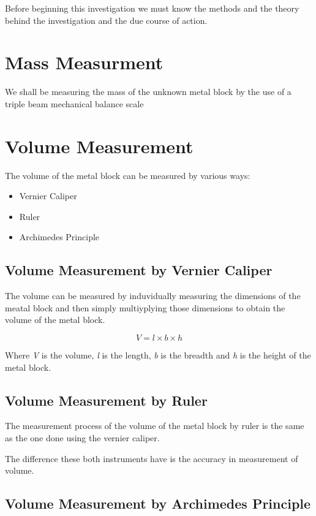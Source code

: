 {Before beginning this investigation we must know the methods and the theory behind the investigation and the due course of action.}

\section{Mass Measurment}

	{We shall be measuring the mass of the unknown metal block by the use of a triple beam mechanical balance scale}

\section{Volume Measurement}

	{The volume of the metal block can be measured by various ways:}
	
	\begin{itemize}
    		\item {Vernier Caliper}
    		\item {Ruler}
    		\item {Archimedes Principle}
    		\label{vol}
	\end{itemize}	
	
	\subsection{Volume Measurement by Vernier Caliper}
		
		{The volume can be measured by induvidually measuring the dimensions of the meatal block and then simply multiyplying those dimensions to obtain the volume of the metal block.}		
		
			$$V = l \times b \times h$$		
		
		{Where \textit{V} is the volume, \textit{l} is the length, \textit{b} is the breadth and \textit{h} is the height of the metal block.}		
		
	\subsection{Volume Measurement by Ruler}
		
		{The measurement process of the volume of the metal block by ruler is the same as the one done using the vernier caliper.}
		
		{The difference these both instruments have is the accuracy in measurement of volume.}		
		
	\subsection{Volume Measurement by Archimedes Principle}
		
